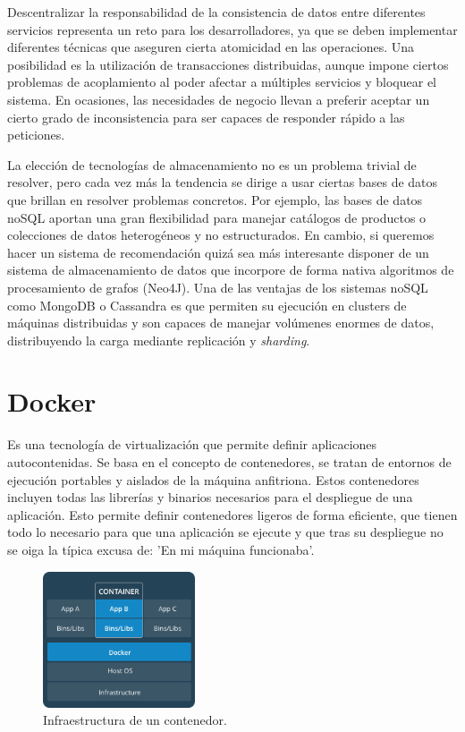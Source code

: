 Descentralizar la responsabilidad de la consistencia de datos entre diferentes servicios representa un reto para los desarrolladores, ya que se deben implementar diferentes técnicas que aseguren cierta atomicidad en las operaciones. Una posibilidad es la utilización de transacciones distribuidas, aunque impone ciertos problemas de acoplamiento al poder afectar a múltiples servicios y bloquear el sistema. En ocasiones, las necesidades de negocio llevan a preferir aceptar un cierto grado de inconsistencia para ser capaces de responder rápido a las peticiones. 

La elección de tecnologías de almacenamiento no es un problema trivial de resolver, pero cada vez más la tendencia se dirige a usar ciertas bases de datos que brillan en resolver problemas concretos. Por ejemplo, las bases de datos noSQL aportan una gran flexibilidad para manejar catálogos de productos o colecciones de datos heterogéneos y no estructurados. En cambio, si queremos hacer un sistema de recomendación quizá sea más interesante disponer de un sistema de almacenamiento de datos que incorpore de forma nativa algoritmos de procesamiento de grafos (Neo4J). Una de las ventajas de los sistemas noSQL como MongoDB o Cassandra es que permiten su ejecución en clusters de máquinas distribuidas y son capaces de manejar volúmenes enormes de datos, distribuyendo la carga mediante replicación y \textit{sharding}.

\vspace{1cm}
\section{Docker }\label{sec:docker}
Es una tecnología de virtualización que permite definir aplicaciones autocontenidas. Se basa en el concepto de contenedores, se tratan de entornos de ejecución portables y aislados de la máquina anfitriona. Estos contenedores incluyen todas las librerías y binarios necesarios para el despliegue de una aplicación. Esto permite definir contenedores ligeros de forma eficiente, que tienen todo lo necesario para que una aplicación se ejecute y que tras su despliegue no se oiga la típica excusa de: 'En mi máquina funcionaba'.

\begin{figure}
\centering
\includegraphics[width=0.4\textwidth]{container.png}
\caption{\label{fig:cont}Infraestructura de un contenedor.}
\end{figure}


